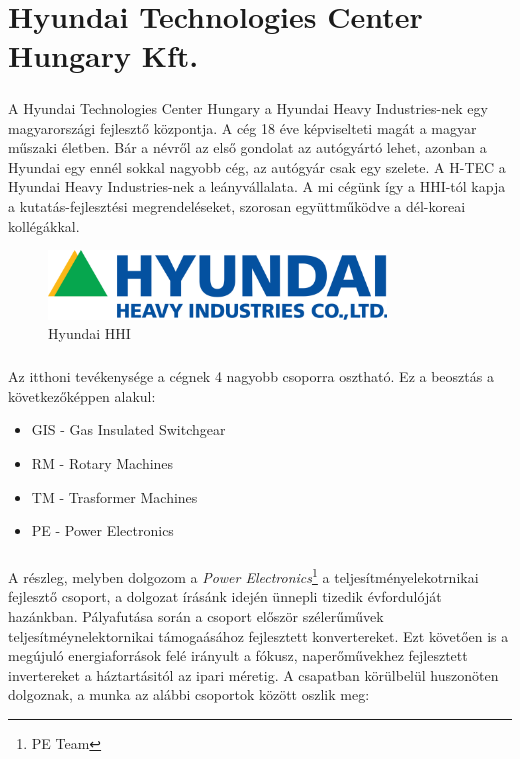 \chapter{Hyundai Technologies Center Hungary Kft.}

\paragraph{}
A Hyundai Technologies Center Hungary a Hyundai Heavy Industries-nek egy magyarországi fejlesztő központja. A cég 18 éve képviselteti magát a magyar műszaki életben. Bár a névről az első gondolat az autógyártó lehet, azonban a Hyundai egy ennél sokkal nagyobb cég, az autógyár csak egy szelete. A H-TEC a Hyundai Heavy Industries-nek a leányvállalata. A mi cégünk így a HHI-tól kapja a kutatás-fejlesztési megrendeléseket, szorosan együttműködve a dél-koreai kollégákkal.

\begin{figure}[h]
	\centering
	\includegraphics[width = 0.8\textwidth]{figures/hyundai_logo.png}
	\caption{Hyundai HHI} 
	\label{fig:hhi}
\end{figure}

\paragraph{}
Az itthoni tevékenysége a cégnek 4 nagyobb csoporra osztható. Ez a beosztás a következőképpen alakul:


\begin{itemize}
	\item{GIS - Gas Insulated Switchgear}
	\item{RM - Rotary Machines}
	\item{TM - Trasformer Machines}
	\item{PE - Power Electronics}
\end{itemize}


\paragraph{}
A részleg, melyben dolgozom a \emph{Power Electronics}\footnote{PE Team} a teljesítményelekotrnikai fejlesztő csoport, a dolgozat írásánk idején ünnepli tizedik évfordulóját hazánkban. Pályafutása során a csoport először szélerűművek teljesítméynelektornikai támogaásához fejlesztett konvertereket. Ezt követően is a megújuló energiaforrások felé irányult a fókusz, naperőművekhez fejlesztett invertereket a háztartásitól az ipari méretig. A csapatban körülbelül huszonöten dolgoznak, a munka az alábbi csoportok között oszlik meg:

